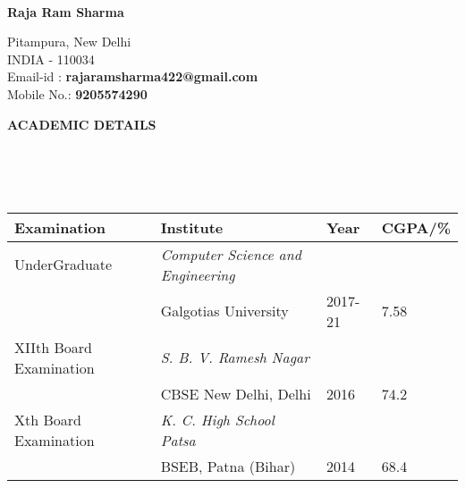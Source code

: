 \documentclass[a4paper,11pt]{article}
\newcommand{\lsep}{-0.5cm}
\newcommand{\resheading}[1]{{\small \colorbox{mygrey}{\begin{minipage}{0.975\textwidth}{\textbf{#1 \vphantom{p\^{E}}}}\end{minipage}}}}
\begin{document}
\hspace{0.5cm}\\[-0.2cm]

\begin{minipage}[ht]{0.7\textwidth}
\large\begin{LARGE}
\textbf{{Raja Ram Sharma}} 
\end{LARGE}

\indent Pitampura, New Delhi \\
\indent INDIA - 110034\\
\indent Email-id : \textbf{rajaramsharma422@gmail.com} \\
\indent Mobile No.: \textbf{9205574290} \\
\end{minipage}
\begin{minipage}[ht]{0.5\textwidth}
\large
\vspace{1cm}
\end{minipage}

\resheading{{ACADEMIC DETAILS} }\\[\lsep]
\\ \\
\indent \begin{tabular}{  l @{\hskip 1in} l @{\hskip 0.4in} l @{\hskip 0.4in} l }
\hline
\textbf{Examination}  & \textbf{Institute} & \textbf{Year} & \textbf{CGPA/\%} \\
\hline
UnderGraduate \,\, & \textit{Computer Science and Engineering} \\
& Galgotias University & 2017-21  & 7.58 \\
XIIth Board Examination & \textit{S. B. V. Ramesh Nagar} \\
& CBSE New Delhi, Delhi & 2016 & 74.2\\
Xth Board Examination & \textit{K. C. High School Patsa} \\
& BSEB, Patna (Bihar) &2014 & 68.4\\
\hline
\end{tabular}
\\ \\
\end{document}

